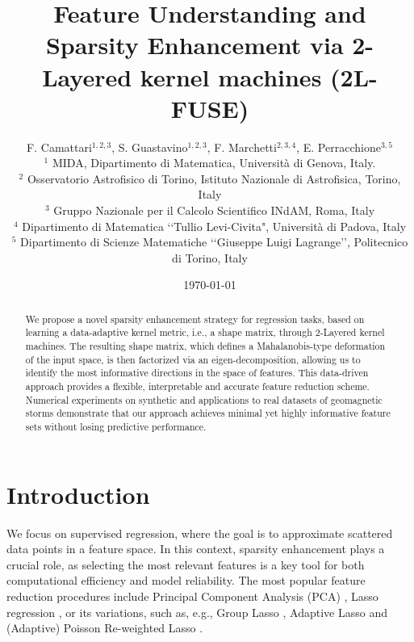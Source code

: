 \documentclass[hyphens,a4paper,11pt]{article}
\title{Feature Understanding and Sparsity Enhancement via 2-Layered kernel machines (2L-FUSE)}
\author{F. Camattari$^{1,2,3}$, S. Guastavino$^{1,2,3}$, F. Marchetti$^{2,3,4}$, E. Perracchione$^{3,5}$\\
$^1$ MIDA, Dipartimento di Matematica, Università di Genova, Italy.\\
$^2$ Osservatorio Astrofisico di Torino, {Istituto Nazionale di Astrofisica}, Torino, {Italy}\\
$^3$ Gruppo Nazionale per il Calcolo Scientifico INdAM, Roma, Italy\\
$^4$ Dipartimento di Matematica \lq\lq Tullio Levi-Civita", Università di Padova,  {Italy}\\
$^5$ Dipartimento di Scienze Matematiche \lq\lq Giuseppe Luigi Lagrange\rq\rq, {Politecnico di Torino}, {Italy}}
\date{\today}
\begin{document}
\maketitle


\begin{abstract}
We propose a novel sparsity enhancement strategy for regression tasks, based on learning a data-adaptive kernel metric, i.e., a shape matrix, through 2-Layered kernel machines. The resulting shape matrix, which defines a Mahalanobis-type deformation of the input space, is then factorized via an eigen-decomposition, allowing us to identify the most informative directions in the space of features. This data-driven approach provides a flexible, interpretable and accurate feature reduction scheme. Numerical experiments on synthetic and applications to real datasets of geomagnetic storms demonstrate that our approach achieves minimal yet highly informative feature sets without losing predictive performance.
\end{abstract}

\section{Introduction}

We focus on supervised regression, where the goal is to approximate scattered data points in a feature space. In this context, sparsity enhancement plays a crucial role, as selecting the most relevant features is a key tool for both computational efficiency and model reliability. 
The most popular feature reduction procedures include Principal Component Analysis (PCA) \cite{jolliffe2002pca}, Lasso regression \cite{lasso}, or its variations, such as, e.g., Group Lasso \cite{yuan2006group}, Adaptive Lasso \cite{zou2006adaptive} and (Adaptive) Poisson Re-weighted Lasso \cite{guastavino2019consistent}. 
\end{document}
